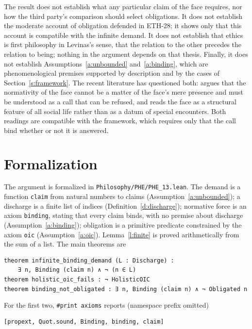 \documentclass{situationist-preprint}
\begin{document}
The result does not establish what any particular claim of the face requires, nor how the third party's comparison should select obligations. It does not establish the moderate account of obligation defended in ETH-28; it shows only that this account is compatible with the infinite demand. It does not establish that ethics is first philosophy in Levinas's sense, that the relation to the other precedes the relation to being; nothing in the argument depends on that thesis. Finally, it does not establish Assumptions~\ref{a:unbounded} and~\ref{a:binding}, which are phenomenological premises supported by description and by the cases of Section~\ref{s:framework}. The recent literature has questioned both: \citet{Perpich2008} argues that the normativity of the face cannot be a matter of the face's mere presence and must be understood as a call that can be refused, and \citet{Morgan2007} reads the face as a structural feature of all social life rather than as a datum of special encounters. Both readings are compatible with the framework, which requires only that the call bind whether or not it is answered.

\section{Formalization}

The argument is formalized in \nolinkurl{Philosophy/PHE/PHE_13.lean}. The demand is a function \texttt{claim} from natural numbers to claims (Assumption~\ref{a:unbounded}); a discharge is a finite list of indices (Definition~\ref{d:discharge}); normative force is an axiom \texttt{binding}, stating that every claim binds, with no premise about discharge (Assumption~\ref{a:binding}); obligation is a primitive predicate constrained by the axiom \texttt{oic} (Assumption~\ref{a:oic}). Lemma~\ref{l:finite} is proved arithmetically from the sum of a list. The main theorems are

\begin{lstlisting}
theorem infinite_binding_demand (L : Discharge) :
    ∃ n, Binding (claim n) ∧ ¬ (n ∈ L)
theorem holistic_oic_fails : ¬ HolisticOIC
theorem binding_not_obligated : ∃ n, Binding (claim n) ∧ ¬ Obligated n
\end{lstlisting}

\noindent For the first two, \texttt{\#print axioms} reports (namespace prefix omitted)

\begin{lstlisting}
[propext, Quot.sound, Binding, binding, claim]
\end{lstlisting}
\end{document}
